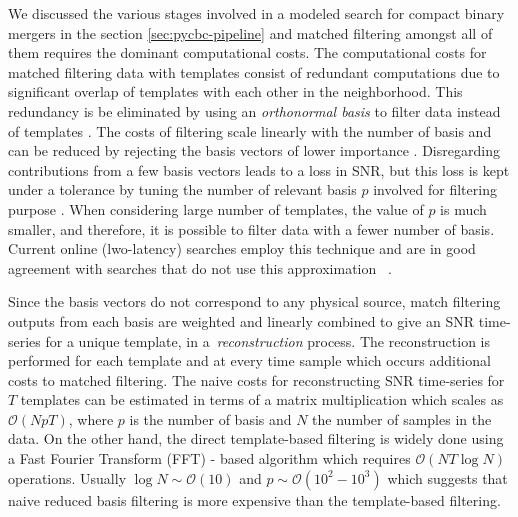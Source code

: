 We discussed the various stages involved in a modeled search for compact binary mergers in the section \ref{sec:pycbc-pipeline} and matched filtering amongst all of them requires the dominant computational costs. The computational costs for matched filtering data with templates consist of redundant computations due to significant overlap of templates with each other in the neighborhood. This redundancy is be eliminated by using an \textit{orthonormal basis} to filter data instead of templates \cite{SVD_initial}. The costs of filtering scale linearly with the number of basis and can be reduced by rejecting the basis vectors of lower importance \cite{SVD_initial}. Disregarding contributions from a few basis vectors leads to a loss in SNR, but this loss is kept under a tolerance by tuning the number of relevant basis $p$
involved for filtering purpose \cite{SVD_initial}. When considering large number of templates, the value of $p$ is much smaller, and therefore, it is possible to filter data with a fewer number of basis. Current online (lwo-latency) searches \cite{GSTlal_online, SPIIR_GPU} employ this technique and are in good agreement with searches that do not use this approximation ~\cite{pycbc_offline, mbta_online}.

Since the basis vectors do not correspond to any physical source, match filtering outputs from each basis are weighted and linearly combined to give an SNR time-series for a unique template, in a~\textit{reconstruction} process. The reconstruction is performed for each template and at every time sample which occurs additional costs to matched filtering. The naive costs for reconstructing SNR time-series for $T$ templates can be estimated in terms of a matrix multiplication which scales as $\mathcal{O}(NpT)$, where $p$ is the number of basis and $N$ the number of samples in the data. On the other hand, the direct template-based filtering is widely done using a Fast Fourier Transform (FFT) - based algorithm which requires $\mathcal{O}(NT\log{N})$ operations. Usually $\log N \sim \mathcal{O}(10)$ and $p \sim \mathcal{O}(10^2-10^3)$ which suggests that naive reduced basis filtering is more expensive than the template-based filtering. 


